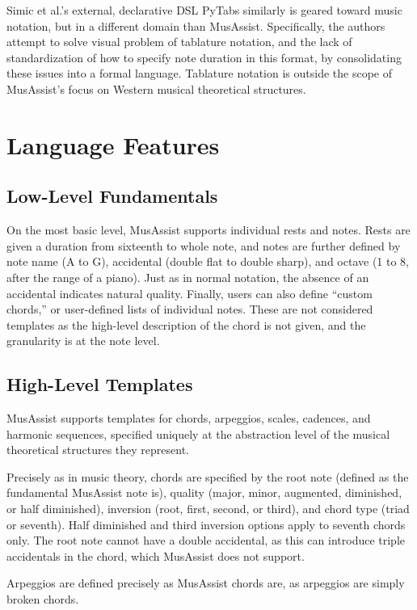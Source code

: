 \documentclass{article}
\begin{document}
Simic et al.'s external, declarative DSL PyTabs similarly is geared toward music notation, but in a different
domain than MusAssist. Specifically, 
the authors attempt to solve visual problem of  tablature  notation, 
and the lack of standardization of how  to specify note duration in this format, by consolidating 
these issues into a formal language. Tablature notation is outside the scope of MusAssist's focus on Western 
musical theoretical structures.

\section{Language Features}\label{sec:language_features}
\subsection{Low-Level Fundamentals}
On the most basic level, MusAssist supports individual rests and notes. Rests are  
given a duration from sixteenth to whole note, and notes are further defined by note name (A to G), 
accidental (double flat to double sharp), and octave (1 to 8, after the range of a piano).
Just as in normal notation, the absence of an accidental indicates natural quality.
Finally, users can also define ``custom chords,'' or user-defined lists of individual notes.
These are not considered templates as the high-level description of the chord is not given, and the
granularity is at the note level.

\subsection{High-Level Templates}
MusAssist supports templates for chords, arpeggios, scales, cadences, and harmonic sequences, specified uniquely
at the abstraction level of the musical theoretical structures they represent.

Precisely as in music theory, chords are specified by the 
root note (defined as the fundamental MusAssist note is),
quality (major, minor, augmented, diminished, or half diminished), 
inversion (root, first, second, or third), and 
chord type (triad or seventh). 
Half diminished and third inversion options apply to seventh chords only. The root note 
cannot have a double accidental, as this can introduce triple accidentals in the chord, which MusAssist
does not support.

Arpeggios are defined precisely as MusAssist chords are, as arpeggios are simply broken chords.
\end{document}

